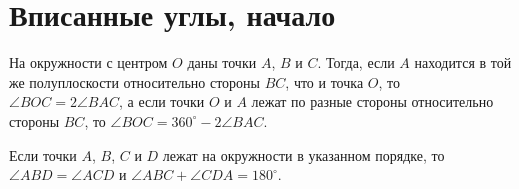 

\section*{Вписанные углы, начало}


На окружности с центром $O$ даны точки $A$, $B$ и $C$.
Тогда, если $A$ находится в той же полуплоскости относительно стороны $BC$, что
и точка $O$, то $\angle BOC = 2 \angle BAC$,
а если точки $O$ и $A$ лежат по разные стороны относительно стороны $BC$, то
$\angle BOC = 360^\circ - 2 \angle BAC$.

\corollary
Если точки $A$, $B$, $C$ и $D$ лежат на окружности в указанном порядке, то
$\angle ABD = \angle ACD$ и $\angle ABC + \angle CDA = 180^\circ$.

